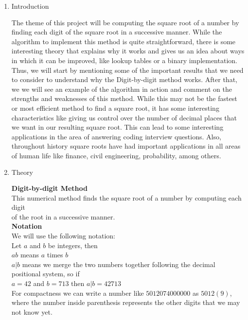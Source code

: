 \documentclass{uofa_template}
\begin{document}
\maketitle

\begin{enumerate}

\item Introduction

The theme of this project will be computing the square root of a number by finding each digit of the square root in a successive manner. While the algorithm to implement this method is quite straightforward, there is some interesting theory that explains why it works and gives us an idea about ways in which it can be improved, like lookup tables or a binary implementation. Thus, we will start by mentioning some of the important results that we need to consider to understand why the Digit-by-digit method works. After that, we we will see an example of the algorithm in action and comment on the strengths and weaknesses of this method. While this may not be the fastest or most efficient method to find a square root, it has some interesting characteristics like giving us control over the number of decimal places that we want in our resulting square root. This can lead to some interesting applications in the area of answering coding interview questions. Also, throughout history square roots have had important applications in all areas of human life like finance, civil engineering, probability, among others. 

\item Theory

\textbf{Digit-by-digit Method} \\
This numerical method finds the square root of a number by computing each digit \\
of the root in a successive manner. \\

\textbf{Notation} \\
We will use the following notation: \\
Let $a$ and $b$ be integers, then  \\
$ab$ means $a$ times $b$ \\
$a|b$ means we merge the two numbers together following the decimal positional system, so if \\
$a = 42$ and $b = 713$ then $a|b = 42713$ \\
For compactness we can write a number like $5012074000000$ as $5012(9)$, where the number inside parenthesis represents the other digits that we may not know yet.\\


\end{enumerate}
\end{document}
